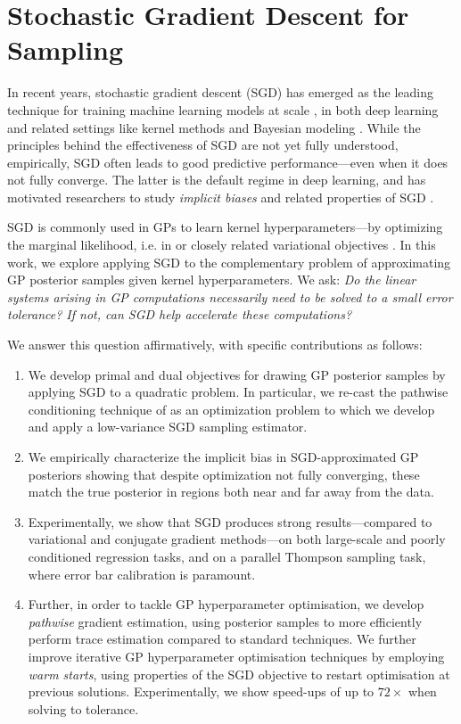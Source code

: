 \section{Stochastic Gradient Descent for Sampling}
\label{sec:sgd_for_sampling}
In recent years, stochastic gradient descent (SGD) has emerged as the leading technique for training machine learning models at scale \cite{Ruder16SGD,Zhang2023sgd}, in both deep learning and related settings like kernel methods \cite{dai2014doubly} and Bayesian modeling \cite{Mandt17Descent}.
While the principles behind the effectiveness of SGD are not yet fully understood, empirically, SGD often leads to good predictive performance---even when it does not fully converge.
The latter is the default regime in deep learning, and has motivated researchers to study \emph{implicit biases} and related properties of SGD \cite{Belkin2019,ZouWBGK2021benign}.

SGD is commonly used in GPs to learn kernel hyperparameters---by optimizing the marginal likelihood, i.e. in  \citep{filippone2015stochastic,Cunningham2016preconditioning,gardner18,chen20,chen22} or closely related variational objectives \cite{titsias2009variational,hensman2013gaussian}. 
In this work, we explore applying SGD to the complementary problem of approximating GP posterior samples given kernel hyperparameters.
We ask: \emph{Do the linear systems arising in GP computations necessarily need to be solved to a small error tolerance? If not, can SGD help accelerate these computations?}

We answer this question affirmatively, with specific contributions as follows: 
\begin{enumerate}
    \item[(i)] We develop primal and dual objectives for drawing GP posterior samples by applying SGD to a quadratic problem. In particular, we re-cast the pathwise conditioning technique of \textcite{wilson2021pathwise} as an optimization problem to which we develop and apply a low-variance SGD sampling estimator.
    \item[(ii)] We empirically characterize the implicit bias in SGD-approximated GP posteriors showing that despite optimization not fully converging, these match the true posterior in regions both near and far away from the data. 
    \item[(iii)] Experimentally, we show that SGD produces strong results---compared to variational and conjugate gradient methods---on both large-scale and poorly conditioned regression tasks, and on a parallel Thompson sampling task, where error bar calibration is paramount.
    \item[(iv)] Further, in order to tackle GP hyperparameter optimisation, we develop \emph{pathwise} gradient estimation, using posterior samples to more efficiently perform trace estimation compared to standard techniques. We further improve iterative GP hyperparameter optimisation techniques by employing \emph{warm starts}, using properties of the SGD objective to restart optimisation at previous solutions. Experimentally, we show speed-ups of up to $72\times$ when solving to tolerance.
\end{enumerate}

